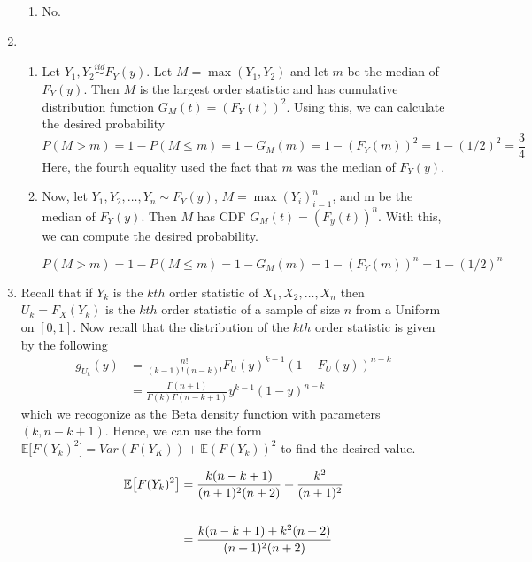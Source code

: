 \documentclass[12pt]{article}  %
\newcommand{\E}{{\mathbb{E}}}
\begin{document}
\begin{enumerate}
\begin{enumerate}
\item No. 

\end{enumerate}

\item 
\begin{enumerate}
\item Let $Y_1, Y_2\overset{iid}{\sim} F_{Y}(y)$. Let $M = \max(Y_1, Y_2)$ and let $m$ be the median of $F_{Y}(y)$. Then $M$ is the largest order statistic and has cumulative distribution function $G_{M}(t) = (F_Y(t))^2$. Using this, we can calculate the desired probability $$P(M>m) = 1 - P(M\leq m) = 1 - G_M(m) = 1 - (F_Y(m))^2 = 1 - (1/2)^2 = \frac{3}{4}$$ Here, the fourth equality used the fact that $m$ was the median of $F_Y(y)$.

\item Now, let $Y_1, Y_2, \ldots, Y_n\sim F_{Y}(y)$, $M = \max(Y_i)_{i=1}^{n}$, and m be the median of $F_Y(y)$. Then $M$ has CDF $G_{M}(t) = (F_y(t))^n$. With this, we can compute the desired probability.

$$P(M>m) = 1 - P(M\leq m) = 1 - G_{M}(m) = 1 - (F_Y(m))^n = 1 - (1/2)^n$$

\end{enumerate}

\item Recall that if $Y_k$ is the $kth$ order statistic of $X_1, X_2, \ldots, X_n$ then $U_k =F_X(Y_k)$ is the $kth$ order statistic of a sample of size $n$ from a Uniform on $[0,1]$. Now recall that the distribution of the $kth$ order statistic is given by the following 
\begin{align*}
g_{U_k}(y) &=\frac{n!}{(k-1)!(n-k)!}F_{U}(y)^{k-1}(1-F_{U}(y))^{n-k}\\	
&= \frac{\Gamma(n+1)}{\Gamma(k)\Gamma(n-k+1)}y^{k-1}(1-y)^{n-k}
\end{align*} which we recogonize as the Beta density function with parameters $(k,n-k+1)$. Hence, we can use the form $\E\big[F(Y_k)^2\big] = Var(F(Y_K)) + \E(F(Y_k))^2$ to find the desired value. 

\begin{align*}
\E\big[F(Y_k)^2\big] &= \frac{k(n-k+1)}{(n+1)^2(n+2)} + \frac{k^2}{(n+1)^2}\\
\vspace{.3em}\\
&= \frac{k(n-k+1) + k^2(n+2)}{(n+1)^2(n+2)}
\end{align*} 

\end{enumerate}
\end{document}
